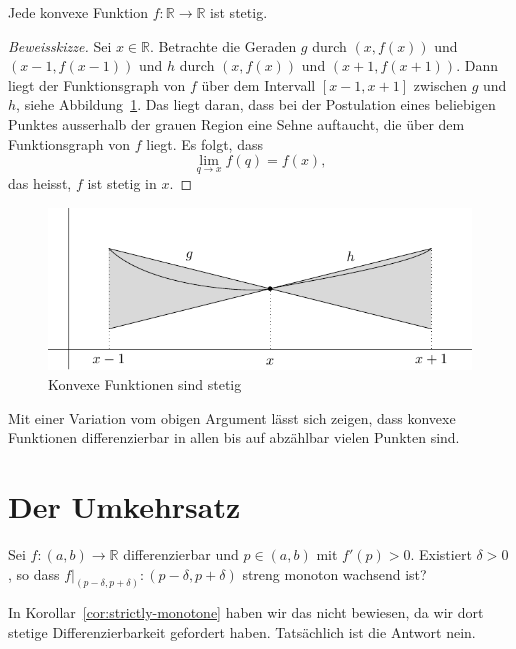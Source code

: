 \documentclass[../main.tex]{subfiles}
\begin{document}
\begin{claim}
  Jede konvexe Funktion $f \colon \mathbb{R} \to \mathbb{R}$ 
  ist stetig.
\end{claim}

\begin{proof}[Beweisskizze]
  Sei $x \in \mathbb{R}$.
  Betrachte die Geraden $g$ 
  durch $(x, f(x))$ und $(x-1, f(x-1))$
  und $h$ durch $(x, f(x))$ und $(x+  1, f(x+1))$.
  Dann liegt der Funktionsgraph von $f$ 
  über dem Intervall $[x-1, x+1]$ zwischen
  $g$ und $h$, siehe Abbildung~\ref{fig:convex-continuous}.
  Das liegt daran, dass bei der Postulation
  eines beliebigen Punktes ausserhalb
  der grauen Region eine Sehne auftaucht,
  die über dem Funktionsgraph von $f$ liegt.
  Es folgt, dass
  \[
    \lim_{q \to x} f(q) = f(x),
  \]
  das heisst, $f$ ist stetig in $x$.
\end{proof}

\begin{figure}[htb]
  \centering
  \includegraphics{images/convex-continuous}
  \caption{Konvexe Funktionen sind stetig}%
  \label{fig:convex-continuous}
\end{figure}

Mit einer Variation vom obigen Argument lässt sich zeigen,
dass konvexe Funktionen differenzierbar in allen
bis auf abzählbar vielen Punkten sind.

\section{Der Umkehrsatz}
\begin{question}
  Sei $f \colon (a, b) \to \mathbb{R}$ differenzierbar
  und $p \in (a, b)$ mit $f'(p) > 0$.
  Existiert $\delta > 0$, so dass
  $f|_{(p - \delta, p + \delta)} \colon
  (p - \delta, p + \delta)$ streng monoton wachsend ist?
\end{question}

In Korollar~\ref{cor:strictly-monotone} haben wir das
nicht bewiesen, da wir dort stetige
Differenzierbarkeit gefordert haben.
Tatsächlich ist die Antwort nein.
\end{document}
